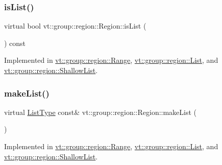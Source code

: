 \mbox{\label{structvt_1_1group_1_1region_1_1_region_a5c05e6ebee5a6d7e77d9ebf33c9ff50c}} 
\subsubsection{\texorpdfstring{is\+List()}{isList()}}
{\footnotesize\ttfamily virtual bool vt\+::group\+::region\+::\+Region\+::is\+List (\begin{DoxyParamCaption}{ }\end{DoxyParamCaption}) const\hspace{0.3cm}{\ttfamily [pure virtual]}}



Implemented in \hyperlink{structvt_1_1group_1_1region_1_1_range_aaa2df0017d61507802bcc90a88fcda91}{vt\+::group\+::region\+::\+Range}, \hyperlink{structvt_1_1group_1_1region_1_1_list_abdde7f8c33453db1938e9a27b3f18bd9}{vt\+::group\+::region\+::\+List}, and \hyperlink{structvt_1_1group_1_1region_1_1_shallow_list_a5d83012cacf2a8ebeb3edb55603fceaa}{vt\+::group\+::region\+::\+Shallow\+List}.

\mbox{\label{structvt_1_1group_1_1region_1_1_region_ac85c027b3c402c712c888aefc198c6be}} 
\subsubsection{\texorpdfstring{make\+List()}{makeList()}}
{\footnotesize\ttfamily virtual \hyperlink{structvt_1_1group_1_1region_1_1_region_a4e35b2fc6dca06aca0b7bc0e19b35c5a}{List\+Type} const\& vt\+::group\+::region\+::\+Region\+::make\+List (\begin{DoxyParamCaption}{ }\end{DoxyParamCaption})\hspace{0.3cm}{\ttfamily [pure virtual]}}



Implemented in \hyperlink{structvt_1_1group_1_1region_1_1_range_abd64b2d424a89ab0f603be15957d0fd4}{vt\+::group\+::region\+::\+Range}, \hyperlink{structvt_1_1group_1_1region_1_1_list_ade171ca43a1bef2feef9952625fba71a}{vt\+::group\+::region\+::\+List}, and \hyperlink{structvt_1_1group_1_1region_1_1_shallow_list_aecf1849757306e2d8a3c339a4bdb6453}{vt\+::group\+::region\+::\+Shallow\+List}.

